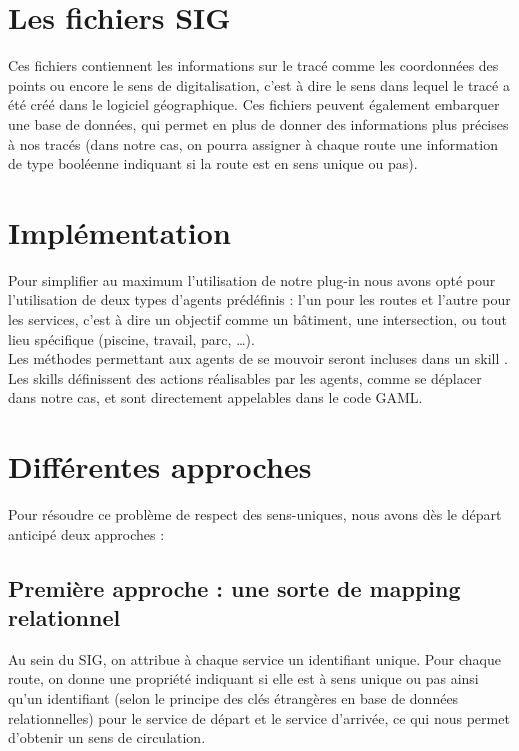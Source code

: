 \documentclass[11pt]{report} %
\begin{document}
\section{Les fichiers SIG}
Ces fichiers contiennent les informations sur le trac\'e comme les coordonn\'ees des points ou encore le sens de digitalisation, c'est \`a dire le sens dans lequel le trac\'e a \'et\'e cr\'e\'e dans le logiciel g\'eographique. Ces fichiers peuvent \'egalement embarquer une base de donn\'ees, qui permet en plus de donner des informations plus pr\'ecises \`a nos trac\'es (dans notre cas, on pourra assigner \`a chaque route une information de type bool\'eenne indiquant si la route est en sens unique ou pas).

\section{Impl\'ementation}
Pour simplifier au maximum l'utilisation de notre plug-in nous avons opt\'e pour l'utilisation de deux types d'agents pr\'ed\'efinis : l'un pour les routes et l'autre pour les services, c'est \`a dire un objectif comme un bâtiment, une intersection, ou tout lieu sp\'ecifique (piscine, travail, parc, …).\\
Les m\'ethodes permettant aux agents de se mouvoir seront incluses dans un \og skill \fg{}. Les skills d\'efinissent des actions r\'ealisables par les agents, comme se d\'eplacer dans notre cas, et sont directement appelables dans le code GAML.

\section{Diff\'erentes approches}
Pour r\'esoudre ce probl\`eme de respect des sens-uniques, nous avons d\`es le d\'epart anticip\'e deux approches :

\subsection{Premi\`ere approche : une sorte de mapping relationnel}
Au sein du SIG, on attribue \`a chaque service un identifiant unique. Pour chaque route, on donne une propri\'et\'e indiquant si elle est \`a sens unique ou pas ainsi qu'un identifiant (selon le principe des cl\'es \'etrang\`eres en base de donn\'ees relationnelles) pour le service de d\'epart et le service d'arriv\'ee, ce qui nous permet d'obtenir un sens de circulation.
\end{document}
